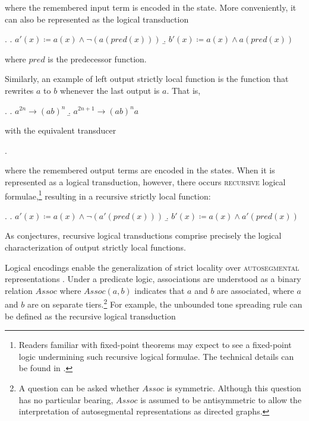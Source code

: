 \documentclass[12pt, a4paper]{report}
\newcommand{\textterm}[1]{\textsc{#1}\index{#1}}
\begin{document}
where the remembered input term is encoded in the state.  More
conveniently, it can also be represented as the logical transduction

\ex.
\a. \(a'(x) \coloneq a(x) \land \neg(a(\mathit{pred}(x)))\)
\b. \(b'(x) \coloneq a(x) \land a(\mathit{pred}(x))\)

where \(\mathit{pred}\) is the predecessor function.

Similarly, an example of left output strictly local function is the
function that rewrites \(a\) to \(b\) whenever the last output is
\(a\).  That is,

\ex.
\a. \(a^{2n} \to (ab)^{n}\)
\b. \(a^{2n+1} \to (ab)^{n}a\)

with the equivalent transducer

\ex.

where the remembered output terms are encoded in the states.  When it
is represented as a logical transduction, however, there occurs
\textterm{recursive} logical formulae,\footnote{Readers familiar with
  fixed-point theorems may expect to see a fixed-point logic
  undermining such recursive logical formulae.  The technical details
  can be found in \textcite{koj18taolns, cj19qlfpfp}.} resulting in a
recursive strictly local function:

\ex.
\a. \(a'(x) \coloneq a(x) \land \neg(a'(\mathit{pred}(x)))\)
\b. \(b'(x) \coloneq a(x) \land a'(\mathit{pred}(x))\)

As \textcite{cj21iolr} conjectures, recursive logical transductions
comprise precisely the logical characterization of output strictly
local functions.

Logical encodings enable the generalization of strict locality over
\textterm{autosegmental} representations \parencite{cj19aislf}.  Under
a predicate logic, associations are understood as a binary relation
\(\mathit{Assoc}\) where \(\mathit{Assoc}(a, b)\) indicates that \(a\)
and \(b\) are associated, where \(a\) and \(b\) are on separate
tiers.\footnote{A question can be asked whether \(\mathit{Assoc}\) is
  symmetric.  Although this question has no particular bearing,
  \(\mathit{Assoc}\) is assumed to be antisymmetric to allow the
  interpretation of autosegmental representations as directed graphs.}
For example, the unbounded tone spreading rule can be defined as the
recursive logical transduction
\end{document}
